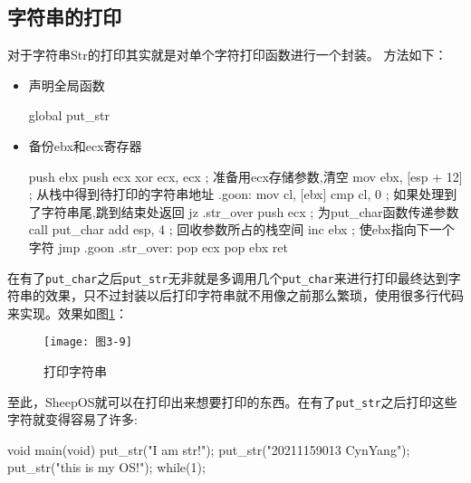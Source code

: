 \subsection{字符串的打印}
\label{subsec:str}

对于字符串Str的打印其实就是对单个字符打印函数进行一个封装。
方法如下：
\begin{itemize}
\item 声明全局函数
\begin{nasmcode}
global put_str
\end{nasmcode}
\item 备份ebx和ecx寄存器
\begin{nasmcode}
   push ebx
   push ecx
   xor ecx, ecx		      ; 准备用ecx存储参数,清空
   mov ebx, [esp + 12]	      ; 从栈中得到待打印的字符串地址 
.goon:
   mov cl, [ebx]
   cmp cl, 0		      ; 如果处理到了字符串尾,跳到结束处返回
   jz .str_over
   push ecx		      ; 为put_char函数传递参数
   call put_char
   add esp, 4		      ; 回收参数所占的栈空间
   inc ebx		      ; 使ebx指向下一个字符
   jmp .goon
.str_over:
   pop ecx
   pop ebx
   ret
\end{nasmcode}
\end{itemize}
在有了\texttt{put\_char}之后\texttt{put\_str}无非就是多调用几个\texttt{put\_char}来进行打印最终达到字
符串的效果，只不过封装以后打印字符串就不用像之前那么繁琐，使用很多行代码来实现。效果如图\ref{fig:print_str}：

\begin{figure}[H]
  \centering
  \texttt{[image: 图3-9]}
  \caption{打印字符串}
  \label{fig:print_str}
\end{figure}

至此，SheepOS就可以在打印出来想要打印的东西。在有了\texttt{put\_str}之后打印这些字符就变得容易了许多:

\begin{codeblock}
\begin{ccode}
void main(void)
{
   put_str("I am str!\n");
   put_str("20211159013 CynYang\n");
   put_str("this is my OS!\n");
   while(1);
}
\end{ccode}  
\end{codeblock}

